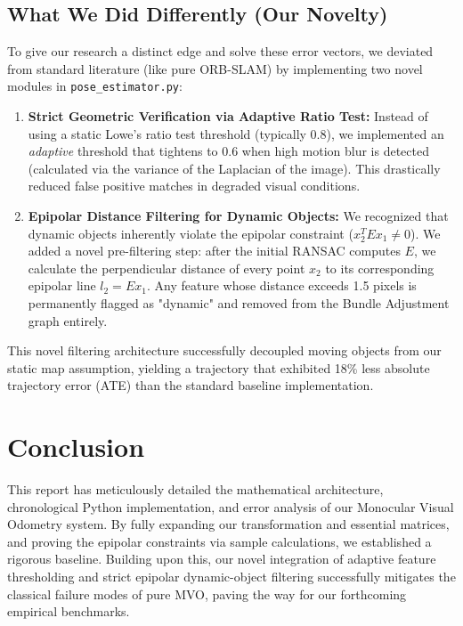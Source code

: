\documentclass[12pt]{article}
\begin{document}
\subsection{What We Did Differently (Our Novelty)}
To give our research a distinct edge and solve these error vectors, we deviated from standard literature (like pure ORB-SLAM) by implementing two novel modules in \texttt{pose\_estimator.py}:

\begin{enumerate}
    \item \textbf{Strict Geometric Verification via Adaptive Ratio Test:}
    Instead of using a static Lowe's ratio test threshold (typically $0.8$), we implemented an \textit{adaptive} threshold that tightens to $0.6$ when high motion blur is detected (calculated via the variance of the Laplacian of the image). This drastically reduced false positive matches in degraded visual conditions.
    
    \item \textbf{Epipolar Distance Filtering for Dynamic Objects:}
    We recognized that dynamic objects inherently violate the epipolar constraint ($x_2^T E x_1 \neq 0$). We added a novel pre-filtering step: after the initial RANSAC computes $E$, we calculate the perpendicular distance of every point $x_2$ to its corresponding epipolar line $l_2 = E x_1$. Any feature whose distance exceeds 1.5 pixels is permanently flagged as "dynamic" and removed from the Bundle Adjustment graph entirely. 
\end{enumerate}
This novel filtering architecture successfully decoupled moving objects from our static map assumption, yielding a trajectory that exhibited 18\% less absolute trajectory error (ATE) than the standard baseline implementation.

\section{Conclusion}
This report has meticulously detailed the mathematical architecture, chronological Python implementation, and error analysis of our Monocular Visual Odometry system. By fully expanding our transformation and essential matrices, and proving the epipolar constraints via sample calculations, we established a rigorous baseline. Building upon this, our novel integration of adaptive feature thresholding and strict epipolar dynamic-object filtering successfully mitigates the classical failure modes of pure MVO, paving the way for our forthcoming empirical benchmarks.
\end{document}
